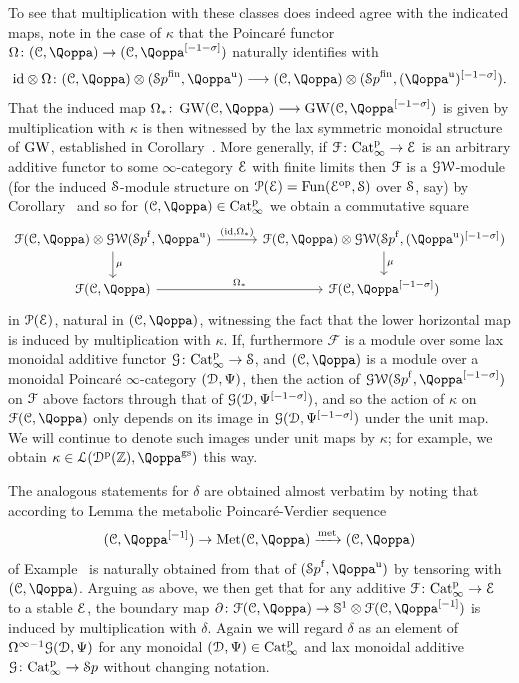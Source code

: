 \begin{construction}
To see that multiplication with these classes does indeed agree with the indicated maps, note in the case of $\kappa$ that the Poincaré functor $\Omega \colon (\C,\QF) \rightarrow (\C,\QF\qshift{-1-\sigma})$ naturally identifies with 
\[
\id \otimes \Om\colon (\C,\QF) \otimes (\Spa^\fin,\QF^\uni) \longrightarrow (\C,\QF) \otimes (\Spa^\fin,(\QF^\uni)\qshift{-1-\sigma}).
\]
That the induced map $\Omega_\ast \colon \GW(\C,\QF) \longrightarrow \GW(\C,\QF\qshift{-1-\sigma})$ is given by multiplication with $\kappa$ is then witnessed by the lax symmetric monoidal structure of $\operatorname{GW}$, established in Corollary~. More generally,
if $\mathcal{F}\colon \mathrm{Cat}^{\mathrm p}_\infty \to \mathcal{E}$ is an arbitrary additive functor to some $\infty$-category $\mathcal{E}$ with finite limits then $\mathcal{F}$ is a $\operatorname{\mathcal{GW}}$-module (for the induced $\mathcal S$-module structure on $\mathcal{P}(\mathcal{E}) = \operatorname{Fun}(\mathcal{E}^\mathrm{op},\mathcal S)$ over $\mathcal S$, say) by Corollary~ and so for $(\C,\QF) \in \Catp$ we obtain a commutative square
\[
\begin{tikzcd}[column sep = 30pt]
\F(\C,\QF) \otimes \GWspace(\Spaf,\QF^{\uni}) \ar[d,"\mu"]\ar[r,"{(\id,\Om_*)}"] & \F(\C,\QF) \otimes \GWspace(\Spaf,(\QF^{\uni})\qshift{-1-\sig}) \ar[d,"\mu"] \\
\F(\C,\QF) \ar[r,"\Om_*"] & \F(\C,\QF\qshift{-1-\sig})
\end{tikzcd}
\]
in $\mathcal{P}(\mathcal{E})$, natural in $(\C,\QF)$, witnessing the fact that the lower horizontal map is induced by multiplication with $\kappa$. 
If, furthermore $\mathcal F$ is a module over some lax monoidal additive functor $\mathcal G \colon \mathrm{Cat}^{\mathrm p}_\infty \rightarrow \mathcal S$, and $(\C,\QF)$ is a module over a monoidal Poincaré $\infty$-category $(\mathcal{D},\Psi)$, then the action of $\GWspace(\Spaf,\QF\qshift{-1-\sigma})$ on $\mathcal{F}$ above factors through that of $\mathcal G(\mathcal{D},\Psi^{[-1-\sigma]})$, and so the action of $\kappa$ on $\F(\C,\QF)$ only depends on its image in $\mathcal G(\mathcal{D},\Psi^{[-1-\sigma]})$ under the unit map. We will continue to denote such images under unit maps by $\kappa$; for example, we obtain $\kappa \in \Lspace(\Dperf(\mathbb Z),\QF^{\mathrm g\sym})$ this way. 








The analogous statements for $\delta$ are obtained almost verbatim by noting that according to Lemma  the metabolic Poincaré-Verdier sequence
\[
(\C,\QF\qshift{-1}) \to \Met(\C,\QF) \xrightarrow{\met} (\C,\QF)
\]
of Example~ is naturally obtained from that of $(\Spaf,\QF^{\uni})$ by tensoring with $(\C,\QF)$. Arguing as above, we then get that for any additive $\mathcal{F}\colon \mathrm{Cat}^{\mathrm p}_\infty \to \mathcal{E}$ to a stable $\mathcal{E}$, the boundary map $\partial\colon \F(\C,\QF) \rightarrow \mathbb S^1 \otimes \F(\C,\QF\qshift{-1})$ is induced by multiplication with $\delta$. Again we will regard $\delta$ as an element of $\Omega^{\infty-1}\mathcal G(\mathcal{D},\Psi)$ for any monoidal $(\mathcal{D},\Psi) \in \mathrm{Cat}^{\mathrm p}_\infty$ and lax monoidal additive $\mathcal G \colon \mathrm{Cat}^{\mathrm p}_\infty \rightarrow {\mathcal Sp}$ without changing notation. 


\end{construction}
